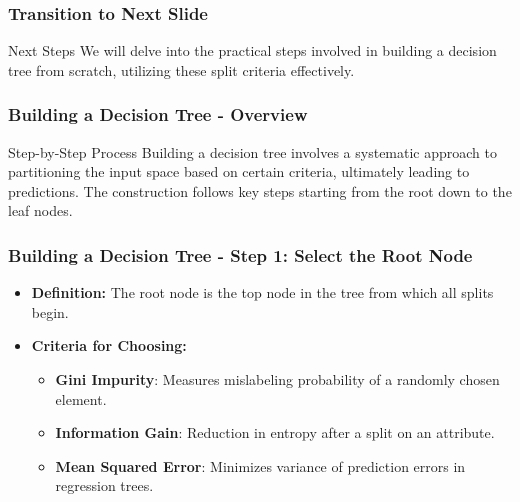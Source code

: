 \documentclass[aspectratio=169]{beamer}
\begin{document}
\begin{frame}[fragile]
    \frametitle{Transition to Next Slide}

    \begin{block}{Next Steps}
        We will delve into the practical steps involved in building a decision tree from scratch, utilizing these split criteria effectively.
    \end{block}

\end{frame}

\begin{frame}[fragile]
    \frametitle{Building a Decision Tree - Overview}
    \begin{block}{Step-by-Step Process}
        Building a decision tree involves a systematic approach to partitioning the input space based on certain criteria, ultimately leading to predictions. The construction follows key steps starting from the root down to the leaf nodes.
    \end{block}
\end{frame}

\begin{frame}[fragile]
    \frametitle{Building a Decision Tree - Step 1: Select the Root Node}
    \begin{itemize}
        \item \textbf{Definition:} The root node is the top node in the tree from which all splits begin.
        \item \textbf{Criteria for Choosing:}
            \begin{itemize}
                \item \textbf{Gini Impurity}: Measures mislabeling probability of a randomly chosen element.
                \item \textbf{Information Gain}: Reduction in entropy after a split on an attribute.
                \item \textbf{Mean Squared Error}: Minimizes variance of prediction errors in regression trees.
            \end{itemize}
    \end{itemize}
\end{frame}
\end{document}
